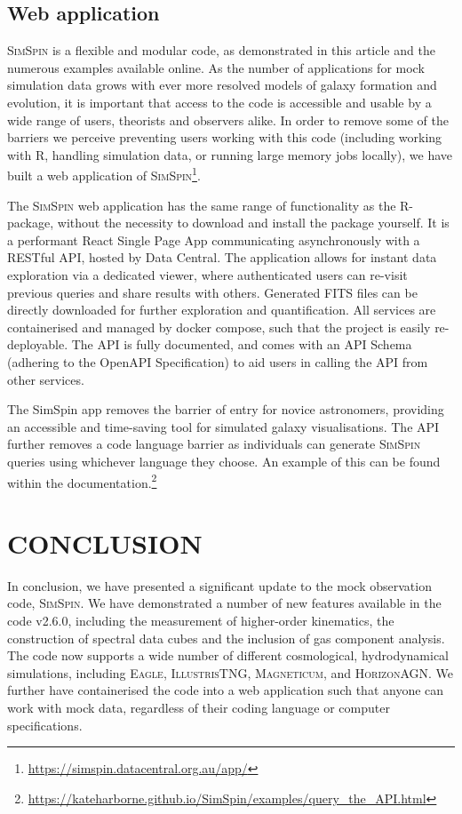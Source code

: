 \documentclass[
  journal=pasa,
  manuscript=research-paper, %
  year=2020,
  volume=37,
]{cup-journal}
\newcommand{\simspin}[1]{\textsc{SimSpin}#1} %
\newcommand{\ssversion}[1]{v2.6.0#1}
\newcommand{\eagle}[1]{\textsc{Eagle}#1} %
\newcommand{\magneticum}[1]{\textsc{Magneticum}#1} %
\newcommand{\illustristng}[1]{\textsc{IllustrisTNG}#1} %
\newcommand{\horizon}[1]{\textsc{HorizonAGN}#1} %
\begin{document}
\subsection{Web application}
\simspin{} is a flexible and modular code, as demonstrated in this article and the numerous examples available online. 
As the number of applications for mock simulation data grows with ever more resolved models of galaxy formation and evolution, it is important that access to the code is accessible and usable by a wide range of users, theorists and observers alike.
In order to remove some of the barriers we perceive preventing users working with this code (including working with R, handling simulation data, or running large memory jobs locally), we have built a web application of \simspin  \footnote{\url{https://simspin.datacentral.org.au/app/}}. 

The \simspin{} web application has the same range of functionality as the R-package, without the necessity to download and install the package yourself.
It is a performant React Single Page App communicating asynchronously with a RESTful API, hosted by Data Central. 
The application allows for instant data exploration via a dedicated viewer, where authenticated users can re-visit previous queries and share results with others. 
Generated FITS files can be directly downloaded for further exploration and quantification. 
All services are containerised and managed by docker compose, such that the project is easily re-deployable. 
The API is fully documented, and comes with an API Schema (adhering to the OpenAPI Specification) to aid users in calling the API from other services.

The SimSpin app removes the barrier of entry for novice astronomers, providing an accessible and time-saving tool for simulated galaxy visualisations.
The API further removes a code language barrier as individuals can generate \simspin{} queries using whichever language they choose. 
An example of this can be found within the documentation.\footnote{\url{https://kateharborne.github.io/SimSpin/examples/query_the_API.html}}

\section{CONCLUSION}

In conclusion, we have presented a significant update to the mock observation code, \simspin. 
We have demonstrated a number of new features available in the code \ssversion, including the measurement of higher-order kinematics, the construction of spectral data cubes and the inclusion of gas component analysis.
The code now supports a wide number of different cosmological, hydrodynamical simulations, including \eagle, \illustristng, \magneticum, and \horizon. 
We further have containerised the code into a web application such that anyone can work with mock data, regardless of their coding language or computer specifications. 
\end{document}
